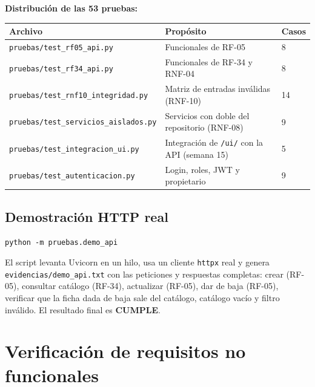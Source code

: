 \documentclass[11pt,a4paper]{article}
\newcommand{\code}[1]{\texttt{#1}}
\newcommand{\thead}[1]{\textbf{#1}}
\begin{document}
\textbf{Distribución de las 53 pruebas:}

{\footnotesize
\begin{tabularx}{\linewidth}{@{}V{1.4}V{1.1}V{0.5}@{}}
\toprule
\thead{Archivo} & \thead{Propósito} & \thead{Casos} \\ \midrule
\code{pruebas/test\_rf05\_api.py} & Funcionales de RF-05 & 8 \\
\code{pruebas/test\_rf34\_api.py} & Funcionales de RF-34 y RNF-04 & 8 \\
\code{pruebas/test\_rnf10\_integridad.py} & Matriz de entradas inválidas
(RNF-10) & 14 \\
\code{pruebas/test\_servicios\_aislados.py} & Servicios con doble del
repositorio (RNF-08) & 9 \\
\code{pruebas/test\_integracion\_ui.py} & Integración de \code{/ui/} con la API
(semana 15) & 5 \\
\code{pruebas/test\_autenticacion.py} & Login, roles, JWT y propietario & 9 \\
\bottomrule
\end{tabularx}
}

\subsection{Demostración HTTP real}

\begin{lstlisting}
python -m pruebas.demo_api
\end{lstlisting}

El script levanta Uvicorn en un hilo, usa un cliente \code{httpx} real y genera
\code{evidencias/demo\_api.txt} con las peticiones y respuestas completas:
crear (RF-05), consultar catálogo (RF-34), actualizar (RF-05), dar de baja
(RF-05), verificar que la ficha dada de baja sale del catálogo, catálogo vacío
y filtro inválido. El resultado final es \textbf{CUMPLE}.

\clearpage

\section{Verificación de requisitos no funcionales}
\end{document}
